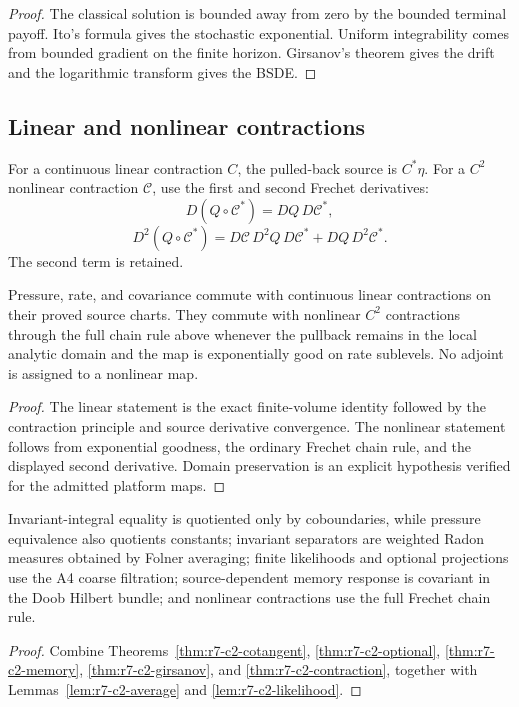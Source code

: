 \begin{proof}
The classical solution is bounded away from zero by the bounded terminal
payoff.  Ito's formula gives the stochastic exponential.  Uniform integrability
comes from bounded gradient on the finite horizon.  Girsanov's theorem gives
the drift and the logarithmic transform gives the BSDE.
\end{proof}

\subsection{Linear and nonlinear contractions}

For a continuous linear contraction $C$, the pulled-back source is $C^*\eta$.
For a $C^2$ nonlinear contraction $\mathcal C$, use the first and second
Frechet derivatives:
\[
 D(Q\circ\mathcal C^*)=DQ\,D\mathcal C^*,
\]
\[
 D^2(Q\circ\mathcal C^*)=
 D\mathcal C\,D^2Q\,D\mathcal C^*
 +DQ\,D^2\mathcal C^*.
\]
The second term is retained.

\begin{theorem}
\label{thm:r7-c2-contraction}
Pressure, rate, and covariance commute with continuous linear contractions on
their proved source charts.  They commute with nonlinear $C^2$ contractions
through the full chain rule above whenever the pullback remains in the local
analytic domain and the map is exponentially good on rate sublevels.  No
adjoint is assigned to a nonlinear map.
\end{theorem}

\begin{proof}
The linear statement is the exact finite-volume identity followed by the
contraction principle and source derivative convergence.  The nonlinear
statement follows from exponential goodness, the ordinary Frechet chain rule,
and the displayed second derivative.  Domain preservation is an explicit
hypothesis verified for the admitted platform maps.
\end{proof}

\begin{theorem}
\label{thm:r7-c2-main}
Invariant-integral equality is quotiented only by coboundaries, while pressure
equivalence also quotients constants; invariant separators are weighted Radon
measures obtained by Folner averaging; finite likelihoods and optional
projections use the A4 coarse filtration; source-dependent memory response is
covariant in the Doob Hilbert bundle; and nonlinear contractions use the full
Frechet chain rule.
\end{theorem}

\begin{proof}
Combine Theorems~\ref{thm:r7-c2-cotangent},
\ref{thm:r7-c2-optional},
\ref{thm:r7-c2-memory},
\ref{thm:r7-c2-girsanov}, and
\ref{thm:r7-c2-contraction}, together with
Lemmas~\ref{lem:r7-c2-average} and
\ref{lem:r7-c2-likelihood}.
\end{proof}
